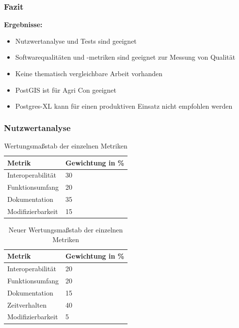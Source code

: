 \documentclass{beamer}
\begin{document}
\begin{frame}\frametitle{Fazit}
\textbf{Ergebnisse:}\\
\begin{itemize}
\item Nutzwertanalyse und Tests sind geeignet%
\item Softwarequalitäten und -metriken sind geeignet zur Messung von Qualität
\item Keine thematisch vergleichbare Arbeit vorhanden
\item PostGIS ist für Agri Con geeignet
\item Postgres-XL kann für einen produktiven Einsatz nicht empfohlen werden
\end{itemize}
\end{frame}
 
\begin{frame}\frametitle{}

\end{frame} 

\begin{frame}\frametitle{Nutzwertanalyse}
\begin{table}
\begin{tabular}{|l|l|}
\hline
\textbf{Metrik} & \textbf{Gewichtung in \%} \\ \hline
Interoperabilität & 30 \\ \hline
Funktionsumfang & 20 \\ \hline
Dokumentation & 35 \\ \hline
Modifizierbarkeit & 15 \\ \hline
\end{tabular}
\caption{Wertungsmaßstab der einzelnen Metriken}
\end{table}

\begin{table}
\begin{tabular}{|l|l|}
\hline
\textbf{Metrik} & \textbf{Gewichtung in \%} \\ \hline
Interoperabilität & 20 \\ \hline
Funktionsumfang & 20 \\ \hline
Dokumentation & 15 \\ \hline
Zeitverhalten & 40 \\ \hline
Modifizierbarkeit & 5 \\ \hline
\end{tabular}
\caption{Neuer Wertungsmaßstab der einzelnen Metriken}
\end{table}
\end{frame}
\end{document}
